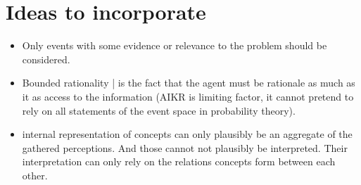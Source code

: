 \documentclass{article}
\begin{document}
\section{Ideas to incorporate}

\begin{itemize}
    \item Only events with some evidence or relevance to the problem should be considered.
    \item Bounded rationality | is the fact that the agent must be rationale as much as it as access to the information (AIKR is limiting factor, it cannot pretend to rely on all statements of the event space in probability theory).
    \item internal representation of concepts can only plausibly be an aggregate of the gathered perceptions. And those cannot not plausibly be interpreted. Their interpretation can only rely on the relations concepts form between each other.
\end{itemize}
\end{document}
